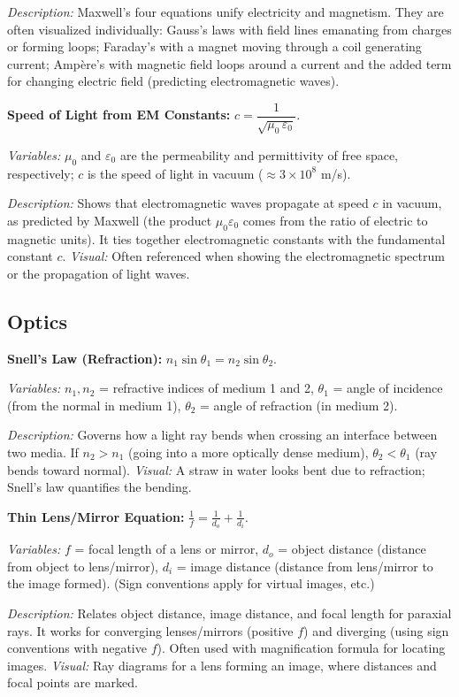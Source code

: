 \documentclass{article}
\begin{document}
\textit{Description:} Maxwell’s four equations unify electricity and magnetism. They are often visualized individually: Gauss’s laws with field lines emanating from charges or forming loops; Faraday’s with a magnet moving through a coil generating current; Ampère’s with magnetic field loops around a current and the added term for changing electric field (predicting electromagnetic waves).

\textbf{Speed of Light from EM Constants:} $c = \dfrac{1}{\sqrt{\mu_0\,\varepsilon_0}}$.

\textit{Variables:} $\mu_0$ and $\varepsilon_0$ are the permeability and permittivity of free space, respectively; $c$ is the speed of light in vacuum ($\approx3\times10^8$ m/s).

\textit{Description:} Shows that electromagnetic waves propagate at speed $c$ in vacuum, as predicted by Maxwell (the product $\mu_0\varepsilon_0$ comes from the ratio of electric to magnetic units). It ties together electromagnetic constants with the fundamental constant $c$. \textit{Visual:} Often referenced when showing the electromagnetic spectrum or the propagation of light waves.

\subsection*{Optics}

\textbf{Snell’s Law (Refraction):} $n_1 \sin \theta_1 = n_2 \sin \theta_2$.

\textit{Variables:} $n_1, n_2$ = refractive indices of medium 1 and 2, $\theta_1$ = angle of incidence (from the normal in medium 1), $\theta_2$ = angle of refraction (in medium 2).

\textit{Description:} Governs how a light ray bends when crossing an interface between two media. If $n_2>n_1$ (going into a more optically dense medium), $\theta_2 < \theta_1$ (ray bends toward normal). \textit{Visual:} A straw in water looks bent due to refraction; Snell’s law quantifies the bending.

\textbf{Thin Lens/Mirror Equation:} $\displaystyle \frac{1}{f} = \frac{1}{d_o} + \frac{1}{d_i}$.

\textit{Variables:} $f$ = focal length of a lens or mirror, $d_o$ = object distance (distance from object to lens/mirror), $d_i$ = image distance (distance from lens/mirror to the image formed). (Sign conventions apply for virtual images, etc.)

\textit{Description:} Relates object distance, image distance, and focal length for paraxial rays. It works for converging lenses/mirrors (positive $f$) and diverging (using sign conventions with negative $f$). Often used with magnification formula for locating images. \textit{Visual:} Ray diagrams for a lens forming an image, where distances and focal points are marked.
\end{document}
